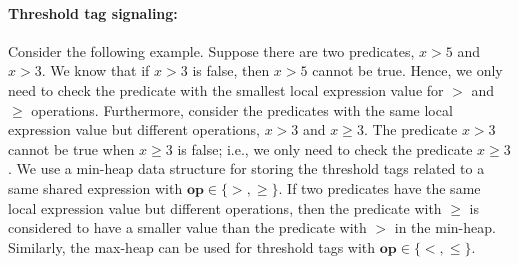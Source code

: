 \documentclass{sigplanconf}
\newtheorem{definition}{Definition}
\begin{document}
\paragraph{Threshold tag signaling:}
Consider the following example. Suppose there are two 
predicates, $x > 5$ and $x > 3$. We know that if $x > 3$ is false, then 
$x > 5$ cannot be true. Hence, we only need to check the predicate with the 
smallest local expression value for $>$ and $\ge$ operations. Furthermore, 
consider the predicates with the same local expression value but different 
operations, $x > 3$ and $x \ge 3$. The predicate $x > 3$ cannot be true when 
$x \ge 3$ is false; i.e., we only need to check the predicate $x \ge 3$. We use
a min-heap data structure for storing the threshold tags related to a same 
shared expression with $\boldsymbol{op} \in \{>, \ge\}$. If two predicates 
have the same local expression value but different operations, then the predicate 
with $\ge$ is considered to have a smaller value than the 
predicate with $>$ in the min-heap.
Similarly, the max-heap can be used for threshold tags with $\boldsymbol{op}
\in \{<, \le\}$. 


\end{document}

